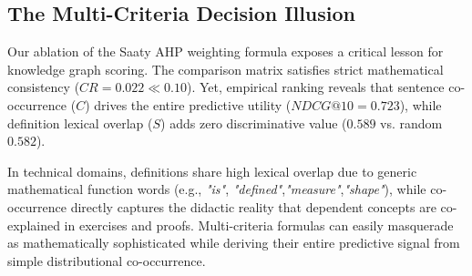 \subsection{The Multi-Criteria Decision Illusion}
Our ablation of the Saaty AHP weighting formula exposes a critical lesson for knowledge graph scoring. The comparison matrix satisfies strict mathematical consistency ($CR = 0.022 \ll 0.10$). Yet, empirical ranking reveals that sentence co-occurrence ($C$) drives the entire predictive utility ($NDCG@10 = 0.723$), while definition lexical overlap ($S$) adds zero discriminative value ($0.589$ vs. random $0.582$). 

In technical domains, definitions share high lexical overlap due to generic mathematical function words (e.g., \textit{"is"}, \textit{"defined"},\textit{"measure"},\textit{"shape"}), while co-occurrence directly captures the didactic reality that dependent concepts are co-explained in exercises and proofs. Multi-criteria formulas can easily masquerade as mathematically sophisticated while deriving their entire predictive signal from simple distributional co-occurrence.
